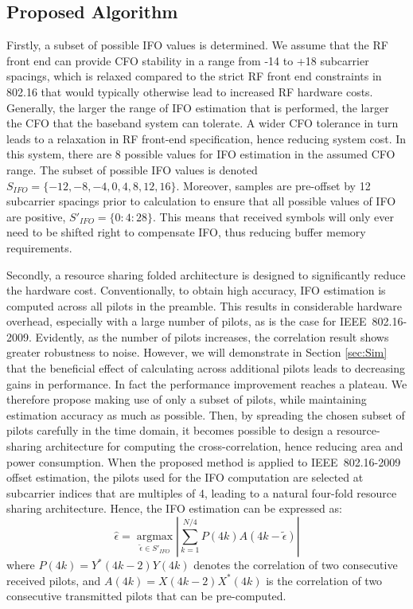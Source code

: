 \subsection{Proposed Algorithm}
Firstly, a subset of possible IFO values is determined.
We assume that the RF front end can provide CFO stability in a range from -14 to +18 subcarrier spacings, which is relaxed compared to the strict RF front end constraints in 802.16 that would typically otherwise lead to increased RF hardware costs.
Generally, the larger the range of IFO estimation that is performed, the larger the CFO that the baseband system can tolerate.
A wider CFO tolerance in turn leads to a relaxation in RF front-end specification, hence reducing system cost.
In this system, there are 8 possible values for IFO estimation in the assumed CFO range.
The subset of possible IFO values is denoted $S_{IFO} = \{-12, -8, -4, 0, 4, 8, 12, 16\}$.  Moreover, samples are pre-offset by 12 subcarrier spacings prior to calculation to ensure that all possible values of IFO are positive, $S'_{IFO} = \{0:4:28\}$.
This means that received symbols will only ever need to be shifted right to compensate IFO, thus reducing buffer memory requirements.

Secondly, a resource sharing folded architecture is designed to significantly reduce the hardware cost.
Conventionally, to obtain high accuracy, IFO estimation is computed across all pilots in the preamble.
This results in considerable hardware overhead, especially with a large number of pilots, as is the case for IEEE~802.16-2009.
Evidently, as the number of pilots increases, the correlation result shows greater robustness to noise.
However, we will demonstrate in Section \ref{sec:Sim} that the beneficial effect of calculating across additional pilots leads to decreasing gains in performance.
In fact the performance improvement reaches a plateau.
We therefore propose making use of only a subset of pilots, while maintaining estimation accuracy as much as possible.
Then, by spreading the chosen subset of pilots carefully in the time domain, it becomes possible to design a resource-sharing architecture for computing the cross-correlation, hence reducing area and power consumption.
When the proposed method is applied to IEEE~802.16-2009 offset estimation, the pilots used for the IFO computation are selected at subcarrier indices that are multiples of 4, leading to a natural four-fold resource sharing architecture. 
Hence, the IFO estimation can be expressed as:
\begin{equation}
\label{integerCFOprop}
\hat{\epsilon} =\underset{\tilde{\epsilon} \in S'_{IFO}}{\operatorname{argmax}}  \left|\sum_{k=1}^{N/4} P(4k)  A(4k-\tilde{\epsilon})\right|
\end{equation}
where $P(4k) = Y^{*}(4k-2) Y(4k)$ denotes the correlation of two consecutive received pilots, and $A(4k) = X(4k-2) X^{*}(4k)$ is the correlation of two consecutive transmitted pilots that can be pre-computed.

